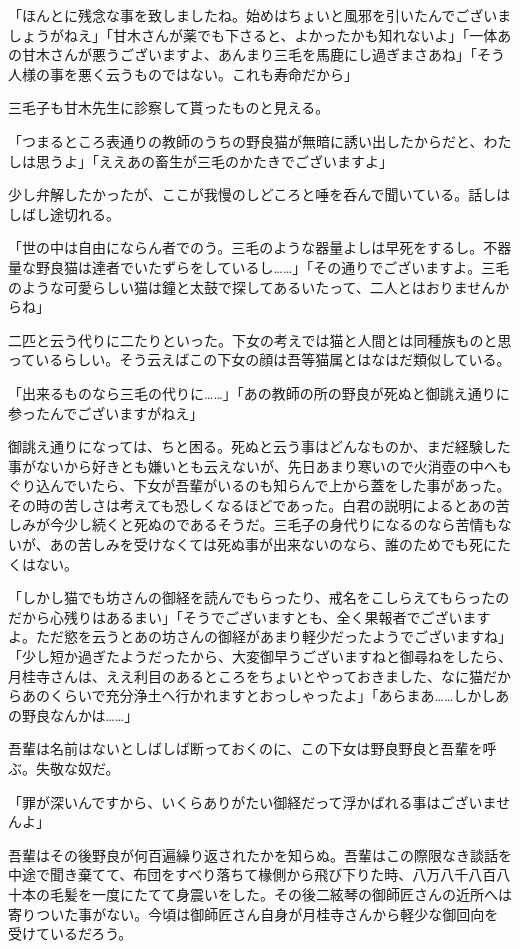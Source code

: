 \documentclass[12pt, openright]{book}
\begin{document}
「ほんとに残念な事を致しましたね。始めはちょいと風邪を引いたんでございましょうがねえ」「甘木さんが薬でも下さると、よかったかも知れないよ」「一体あの甘木さんが悪うございますよ、あんまり三毛を馬鹿にし過ぎまさあね」「そう人様の事を悪く云うものではない。これも寿命だから」

三毛子も甘木先生に診察して貰ったものと見える。

「つまるところ表通りの教師のうちの野良猫が無暗に誘い出したからだと、わたしは思うよ」「ええあの畜生が三毛のかたきでございますよ」

少し弁解したかったが、ここが我慢のしどころと唾を呑んで聞いている。話しはしばし途切れる。

「世の中は自由にならん者でのう。三毛のような器量よしは早死をするし。不器量な野良猫は達者でいたずらをしているし\ldots{}\ldots{}」「その通りでございますよ。三毛のような可愛らしい猫は鐘と太鼓で探してあるいたって、二人とはおりませんからね」

二匹と云う代りに二たりといった。下女の考えでは猫と人間とは同種族ものと思っているらしい。そう云えばこの下女の顔は吾等猫属とはなはだ類似している。

「出来るものなら三毛の代りに\ldots{}\ldots{}」「あの教師の所の野良が死ぬと御誂え通りに参ったんでございますがねえ」

御誂え通りになっては、ちと困る。死ぬと云う事はどんなものか、まだ経験した事がないから好きとも嫌いとも云えないが、先日あまり寒いので火消壺の中へもぐり込んでいたら、下女が吾輩がいるのも知らんで上から蓋をした事があった。その時の苦しさは考えても恐しくなるほどであった。白君の説明によるとあの苦しみが今少し続くと死ぬのであるそうだ。三毛子の身代りになるのなら苦情もないが、あの苦しみを受けなくては死ぬ事が出来ないのなら、誰のためでも死にたくはない。

「しかし猫でも坊さんの御経を読んでもらったり、戒名をこしらえてもらったのだから心残りはあるまい」「そうでございますとも、全く果報者でございますよ。ただ慾を云うとあの坊さんの御経があまり軽少だったようでございますね」「少し短か過ぎたようだったから、大変御早うございますねと御尋ねをしたら、月桂寺さんは、ええ利目のあるところをちょいとやっておきました、なに猫だからあのくらいで充分浄土へ行かれますとおっしゃったよ」「あらまあ\ldots{}\ldots{}しかしあの野良なんかは\ldots{}\ldots{}」

吾輩は名前はないとしばしば断っておくのに、この下女は野良野良と吾輩を呼ぶ。失敬な奴だ。

「罪が深いんですから、いくらありがたい御経だって浮かばれる事はございませんよ」

吾輩はその後野良が何百遍繰り返されたかを知らぬ。吾輩はこの際限なき談話を中途で聞き棄てて、布団をすべり落ちて椽側から飛び下りた時、八万八千八百八十本の毛髪を一度にたてて身震いをした。その後二絃琴の御師匠さんの近所へは寄りついた事がない。今頃は御師匠さん自身が月桂寺さんから軽少な御回向を受けているだろう。
\end{document}
